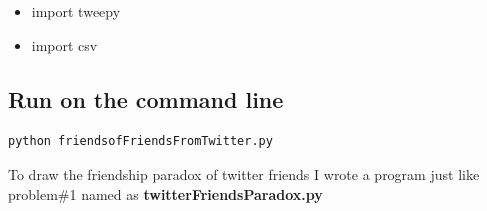 \documentclass[letterpaper,11pt]{article}
\begin{document}
\begin{itemize}
    \item import tweepy
    \item import csv
\end{itemize}
\subsection*{Run on the command line}
\begin{lstlisting}[frame=single]
python friendsofFriendsFromTwitter.py
\end{lstlisting}

To draw the friendship paradox of twitter friends I wrote a program just like problem\#1 named as \textbf{twitterFriendsParadox.py}
\end{document}
